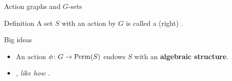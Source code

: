 \documentclass[8pt, handout]{beamer}
\newcommand{\Pause}{}      %
\begin{document}
\begin{frame}{Action graphs and $G$-sets}
  
  \begin{block}{Definition}
    A set $S$ with an action by $G$ is called a (right)
    .
  \end{block}
  
  \begin{alertblock}{Big ideas}
   \begin{itemize}
    \item An action $\phi\colon G\to\operatorname{Perm}(S)$ endows $S$ with an
      \textbf{algebraic structure}.
    \item \emph{, like how
      .}
    \end{itemize}
  \end{alertblock}

  \vspace{-3mm}


\end{frame}
\end{document}
